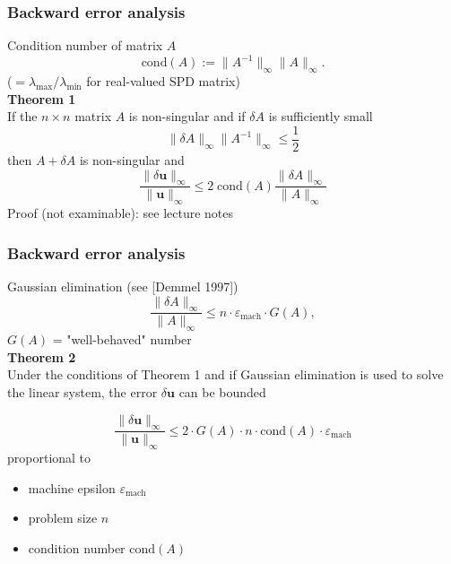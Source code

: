 \documentclass{beamer}
\begin{document}

\begin{frame}
\frametitle{Backward error analysis}
Condition number of matrix $A$
$$
\text{cond}(A) := \|A^{-1}\|_\infty\|A\|_\infty.
$$
($=\lambda_{\text{max}}/\lambda_{\text{min}}$ for real-valued SPD matrix)\\[2ex]
\textbf{Theorem 1}\\
If the $n\times n$ matrix $A$ is non-singular and if $\delta A$ is sufficiently small
$$
\|\delta A\|_{\infty} \|A^{-1}\|_\infty \le \frac{1}{2}
$$
then $A+\delta A$ is non-singular and
$$
\frac{\|\delta\boldsymbol{u}\|_\infty}{\|\boldsymbol{u}\|_\infty} \le 2\;\text{cond}(A) \frac{\|\delta A\|_\infty}{\|A\|_\infty}
$$
Proof (not examinable): see lecture notes
\end{frame}


\begin{frame}
\frametitle{Backward error analysis}
Gaussian elimination {\footnotesize(see [Demmel 1997])}
$$
\frac{\|\delta A\|_\infty}{\|A\|_\infty} \le n\cdot \varepsilon_{\text{mach}}\cdot G(A),
$$
$G(A)$ = "well-behaved" number\\[2ex]

\textbf{Theorem 2}\quad{\footnotesize [Demmel 1997]}\\
Under the conditions of Theorem 1 and if Gaussian elimination is used to solve the linear system, the error $\delta \boldsymbol{u}$ can be bounded

$$
\frac{\|\delta\boldsymbol{u}\|_\infty}{\|\boldsymbol{u}\|_\infty} \le 2\cdot G(A)\cdot n\cdot \text{cond}(A)\cdot \varepsilon_{\text{mach}}
$$
proportional to
\begin{itemize}
\item  machine epsilon $\varepsilon_{\text{mach}}$
\item problem size $n$
\item condition number $\text{cond}(A)$
\end{itemize}
\end{frame}

\end{document}
